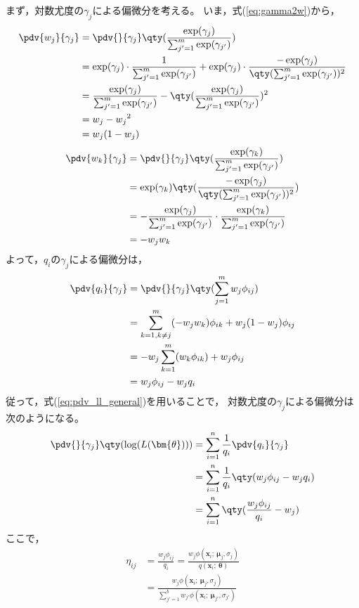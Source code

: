 \documentclass[class=jsarticle, crop=false, dvipdfmx, fleqn]{standalone}
\begin{document}
まず，対数尤度の\(\gamma_j\)による偏微分を考える。
いま，式(\ref{eq:gamma2w})から，
\begin{align}
    \pdv{w_j}{\gamma_j}
        & = \pdv{}{\gamma_j} \qty(\frac{\exp(\gamma_j)}{\sum_{j'=1}^{m} \exp(\gamma_{j'})}) \\
        & = \exp(\gamma_j) \cdot \frac{1}{\sum_{j'=1}^{m} \exp(\gamma_{j'})}
            + \exp(\gamma_j) \cdot \frac{-\exp(\gamma_j)}{\qty(\sum_{j'=1}^{m} \exp(\gamma_{j'}))^2} \\
        & = \frac{\exp(\gamma_j)}{\sum_{j'=1}^{m} \exp(\gamma_{j'})} - \qty(\frac{\exp(\gamma_j)}{\sum_{j'=1}^{m} \exp(\gamma_{j'})})^2 \\
        & = w_j - {w_j}^2 \\
        & = w_j (1 - w_j)
\end{align}
\begin{align}
    \pdv{w_k}{\gamma_j}
        & = \pdv{}{\gamma_j} \qty(\frac{\exp(\gamma_k)}{\sum_{j'=1}^{m} \exp(\gamma_{j'})}) \\
        & = \exp(\gamma_k) \qty(\frac{-\exp(\gamma_j)}{\qty(\sum_{j'=1}^{m} \exp(\gamma_{j'}))^2}) \\
        & = - \frac{\exp(\gamma_j)}{\sum_{j'=1}^{m} \exp(\gamma_{j'})} \cdot \frac{\exp(\gamma_k)}{\sum_{j'=1}^{m} \exp(\gamma_{j'})} \\
        & = - w_j w_k
\end{align}
よって，\(q_i\)の\(\gamma_j\)による偏微分は，
\begin{align}
    \pdv{q_i}{\gamma_j}
        & = \pdv{}{\gamma_j} \qty(\sum_{j=1}^{m} w_j \phi_{ij}) \\
        & = \sum_{k = 1, k \neq j}^{m} (- w_j w_k)\phi_{ik} + w_j (1 - w_j)\phi_{ij} \\
        & = - w_j \sum_{k=1}^{m} (w_k \phi_{ik}) + w_j \phi_{ij} \\
        & = w_j \phi_{ij} - w_j q_i
\end{align}
従って，式(\ref{eq:pdv_ll_general})を用いることで，
対数尤度の\(\gamma_j\)による偏微分は次のようになる。
\begin{align}
    \pdv{}{\gamma_j} \qty(\log(L(\bm{\theta})))
        & = \sum_{i=1}^{n} \frac{1}{q_i} \pdv{q_i}{\gamma_j} \\
        & = \sum_{i=1}^{n} \frac{1}{q_i} \qty(w_j \phi_{ij} - w_j q_i) \\
        & = \sum_{i=1}^{n} \qty(\frac{w_j \phi_{ij}}{q_i} - w_j)
\end{align}
ここで，
\begin{align}
    \eta_{ij}
        & = \frac{w_j \phi_{ij}}{q_i}
        = \frac{w_j \phi(\bm{x}_i;\ \bm{\mu}_j, \sigma_j)}{q(\bm{x}_i;\ \bm{\theta})} \\
        & = \frac{w_j \phi(\bm{x}_i;\ \bm{\mu}_j, \sigma_j)}{\sum_{j'=1}^{b} w_{j'} \phi(\bm{x}_i;\ \bm{\mu}_{j'}, \sigma_{j'})}
            \label{eq:eta}
\end{align}
\end{document}
